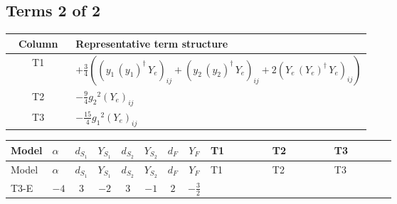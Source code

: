 \documentclass[8pt]{article}
\begin{document}
\begin{landscape}
\subsection*{Terms 2 of 2}
\begin{center}
\begin{tabular}{@{}c >{\raggedright\arraybackslash}p{0.82\linewidth}@{}}
\toprule
Column & Representative term structure \\
\midrule
T1 & \(\displaystyle +\frac{3}{4} (\left({y_1}\,\left({y_1}\right)^{\dagger}\,{Y_e}\right)_{ij}+\left({y_2}\,\left({y_2}\right)^{\dagger}\,{Y_e}\right)_{ij}+2 \left({Y_e}\,\left({Y_e}\right)^{\dagger}\,{Y_e}\right)_{ij})\) \\
\midrule
T2 & \(\displaystyle -\frac{9}{4} {g_2}^2 \left({Y_e}\right)_{ij}\) \\
\midrule
T3 & \(\displaystyle -\frac{15}{4} {g_1}^2 \left({Y_e}\right)_{ij}\) \\
\midrule
\bottomrule
\end{tabular}
\end{center}
\smallskip
\tiny
\begin{longtable}{@{}llcccccc >{\raggedright\arraybackslash}p{0.21\linewidth} >{\raggedright\arraybackslash}p{0.21\linewidth} >{\raggedright\arraybackslash}p{0.21\linewidth}@{}}
\toprule
Model & $\alpha$ & $d_{S_1}$ & $Y_{S_1}$ & $d_{S_2}$ & $Y_{S_2}$ & $d_F$ & $Y_F$ & T1 & T2 & T3 \\
\midrule
\endfirsthead
\toprule
Model & $\alpha$ & $d_{S_1}$ & $Y_{S_1}$ & $d_{S_2}$ & $Y_{S_2}$ & $d_F$ & $Y_F$ & T1 & T2 & T3 \\
\midrule
\endhead
T3-E & $-4$ & $3$ & $-2$ & $3$ & $-1$ & $2$ & $-\frac{3}{2}$ & \scriptsize\adjustbox{max width=\linewidth}{$\begin{gathered} +\frac{3}{4} (\left({y_1}\,\left({y_1}\right)^{\dagger}\,{Y_e}\right)_{ij}+\left({y_2}\,\left({y_2}\right)^{\dagger}\,{Y_e}\right)_{ij}+2 \left({Y_e}\,\left({Y_e}\right)^{\dagger}\,{Y_e}\right)_{ij})\end{gathered}$} & \scriptsize\adjustbox{max width=\linewidth}{$\begin{gathered} -\frac{9}{4} {g_2}^2 \left({Y_e}\right)_{ij}\end{gathered}$} & \scriptsize\adjustbox{max width=\linewidth}{$\begin{gathered} -\frac{15}{4} {g_1}^2 \left({Y_e}\right)_{ij}\end{gathered}$} \\
\midrule
\bottomrule
\end{longtable}
\clearpage

\end{landscape}
\end{document}
